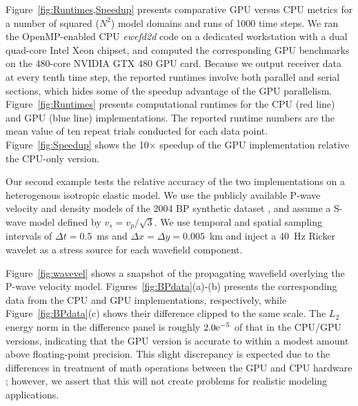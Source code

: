 Figure~\ref{fig:Runtimes,Speedup} presents comparative GPU versus CPU metrics for a number of squared ($N^2$) model domains and runs of 1000 time steps.  We ran the OpenMP-enabled CPU {\it ewefd2d} code on a dedicated workstation with a dual quad-core Intel Xeon chipset, and computed the corresponding GPU benchmarks on the 480-core NVIDIA GTX 480 GPU card.  Because we output receiver data at every tenth time step, the reported runtimes involve both parallel and serial sections, which hides some of the speedup advantage of the GPU parallelism.  Figure~\ref{fig:Runtimes} presents computational runtimes for the CPU (red line) and GPU (blue line) implementations.  The reported runtime numbers are the mean value of ten repeat trials conducted for each data point.  Figure~\ref{fig:Speedup} shows the 10$\times$ speedup of the GPU implementation relative the CPU-only version.  


Our second example tests the relative accuracy of the two implementations on a heterogenous isotropic elastic model.  We use the publicly available P-wave velocity and density models of the 2004 BP synthetic dataset \cite[]{bpdata}, and assume a S-wave model defined by $v_s=v_p/\sqrt{3}$.  We use temporal and spatial sampling intervals of $\Delta t=0.5$~ms and $\Delta x=\Delta y=0.005$~km and inject a 40~Hz Ricker wavelet as a stress source for each wavefield component.

Figure~\ref{fig:wavevel} shows a snapshot of the propagating wavefield overlying the P-wave velocity model. Figures~\ref{fig:BPdata}(a)-(b) presents the corresponding data from the CPU and GPU implementations, respectively, while Figure~\ref{fig:BPdata}(c) shows their difference clipped to the same scale.  The $L_2$ energy norm in the difference panel is roughly $2.0{\rm e}^{-5}$ of that in the CPU/GPU versions, indicating that the GPU version is accurate to within a modest amount above floating-point precision.  This slight discrepancy is expected due to the differences in treatment of math operations between the GPU and CPU hardware \cite[]{Whitehead}; however, we assert that this will not create problems for realistic modeling applications.


